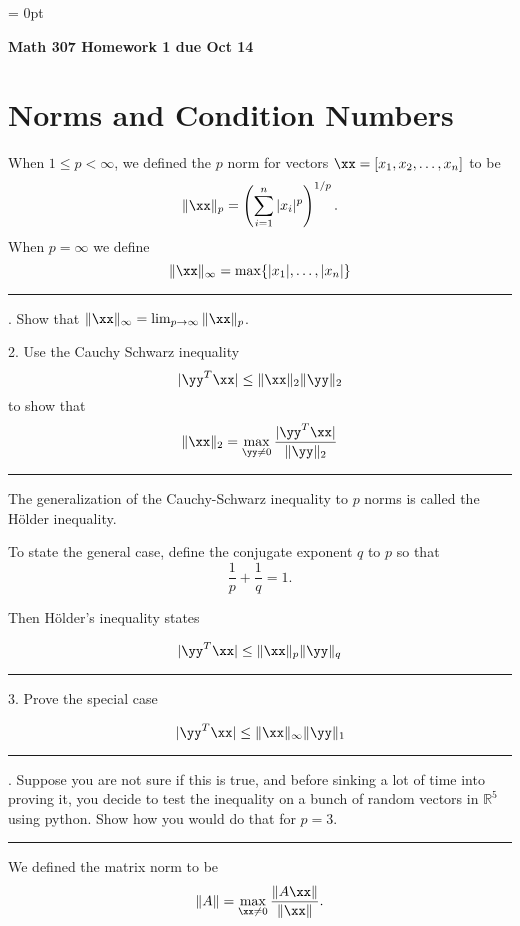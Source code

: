 
\standardpackages
\usepackage[utf8]{inputenc}
\parindent = 0pt



\begin{center}
{\normalfont\Large\bfseries Math 307 Homework 1  due  Oct 14 }
\end{center}
\bigskip\bigskip

\section{Norms and Condition Numbers}

When $1\le p < \infty$, we defined the $p$ norm for vectors $\xx = [x_1, x_2, \ldots, x_n]$
to be
$$
\|\xx\|_p = \left(\sum_{i=1}^n |x_i|^p\right)^{1/p}.
$$
When $p=\infty$ we define
$$
\|\xx\|_\infty =\max\{|x_1|,\ldots, |x_n|\}
$$
\bigskip
\hrule
{}. Show  that $\|\xx\|_\infty = \lim_{p\rightarrow\infty}\|\xx\|_p$.

2. Use the Cauchy Schwarz inequality
$$
|\yy^T \xx| \le \|\xx\|_2\|\yy\|_2
$$
to show that 
$$
\|\xx\|_2 = \max_{\yy\ne 0}\frac{ |\yy^T \xx|}{\|\yy\|_2}
$$


\bigskip
\hrule
\bigskip

The generalization of the Cauchy-Schwarz inequality to $p$ norms is called the 
Hölder inequality. 


 To state the general case, define the conjugate exponent $q$ to $p$ so that $$\frac{1}{p} + \frac{1}{q} = 1.$$
 
 Then Hölder's inequality states

$$
|\yy^T \xx| \le \|\xx\|_p\|\yy\|_q
$$

\bigskip
\bigskip
\hrule
\bigskip

\vfill\eject

3. Prove the special case

$$
|\yy^T \xx| \le \|\xx\|_\infty\|\yy\|_1
$$

 
\hrule
{}. Suppose you are not sure if this is true, and before sinking a lot of time into proving it, you decide to test the inequality on a bunch of random vectors in $\mathbb R^5$ using python.
Show how you would do that for $p=3$.

\bigskip
\hrule
\bigskip

We defined the matrix norm to be
$$
\|A\| = \max_{\xx\ne 0} \frac{\|A\xx\|}{\|\xx\|}.
$$

